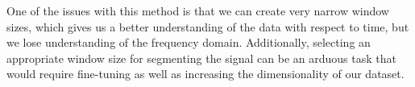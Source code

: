 \documentclass{turabian-thesis}
\begin{document}
One of the issues with this method is that we can create very narrow window sizes, which gives us a better understanding of the data with respect to time, but we lose understanding of the frequency domain. Additionally, selecting an appropriate window size for segmenting the signal can be an arduous task that would require fine-tuning as well as increasing the dimensionality of our dataset.



\end{document}

